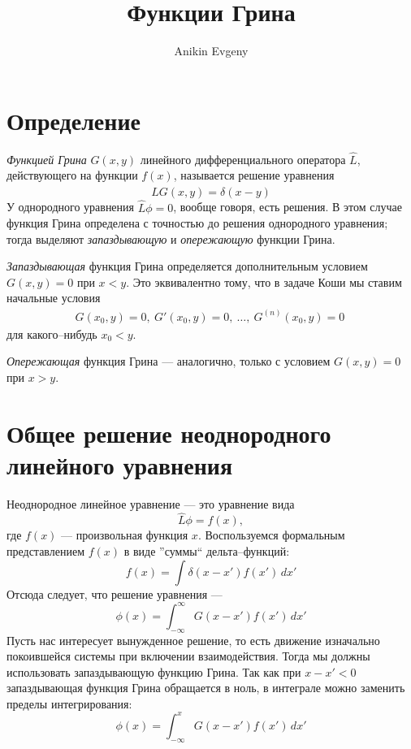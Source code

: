 \documentclass{article}
\title{Функции Грина}
\author{Anikin Evgeny}
\begin{document}
\maketitle
\section{Определение}
{\it Функцией Грина} $G(x,y)$ линейного дифференциального оператора $\hat{L}$,
действующего на функции $f(x)$, называется
решение уравнения
\begin{equation}
    \hat{L}G(x,y) = \delta(x - y)
\end{equation}
У однородного уравнения $\hat{L}\phi = 0$, вообще говоря, есть решения. В этом случае
функция Грина определена с точностью до решения однородного уравнения; тогда выделяют 
{\it запаздывающую} и {\it опережающую} функции Грина. 

{\it Запаздывающая} функция Грина определяется дополнительным условием $G(x,y) = 0$ при
$x < y$. Это эквивалентно тому, что в задаче Коши мы ставим начальные условия 
\begin{equation}
    \begin{gathered}
        G(x_0, y) = 0,\
        G'(x_0, y) = 0,\
        \dots,\
        G^{(n)}(x_0, y) = 0\
    \end{gathered}
\end{equation}
для какого--нибудь $x_0 < y$.

{\it Опережающая} функция Грина --- аналогично, только с условием $G(x,y) = 0$ при
$x > y$.

\section{Общее решение неоднородного линейного уравнения}
Неоднородное линейное уравнение --- это уравнение вида 
\begin{equation}
    \hat{L}\phi = f(x),
\end{equation}
где $f(x)$ --- произвольная функция $x$. Воспользуемся формальным представлением $f(x)$ 
в виде ''суммы`` дельта--функций:
\begin{equation}
    f(x) = \int \delta(x-x') f(x')\, dx'
\end{equation}
Отсюда следует, что решение уравнения --- 
\begin{equation}
    \phi(x) = \int_{-\infty}^{\infty} G(x - x') f(x') \, dx'
\end{equation}
Пусть нас интересует вынужденное решение, то есть движение изначально покоившейся системы
при включении взаимодействия. Тогда мы должны использовать 
запаздывающую функцию Грина. Так как при $x - x' < 0$ запаздывающая функция Грина
обращается в ноль, в интеграле можно заменить пределы интегрирования:
\begin{equation}
    \phi(x) = \int_{-\infty}^{x} G(x - x') f(x') \, dx'
\end{equation}
\end{document}
